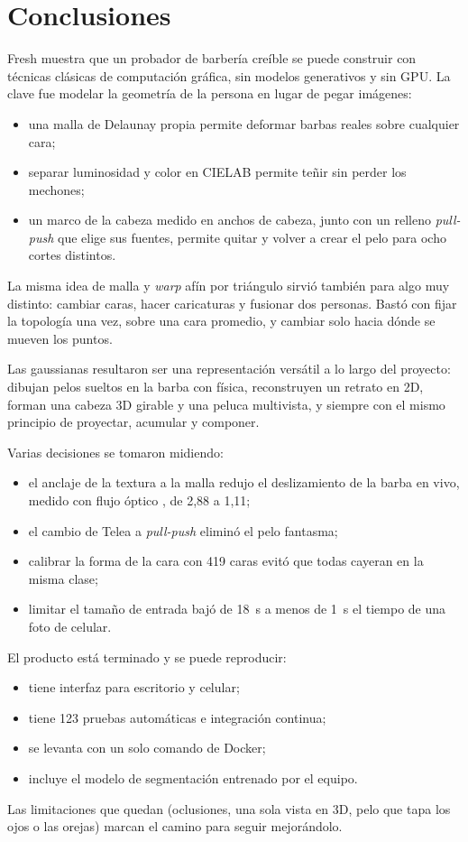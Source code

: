 \section{Conclusiones}
\label{sec:conclusiones}

Fresh muestra que un probador de barbería creíble se puede construir con técnicas clásicas de computación gráfica, sin modelos generativos y sin GPU. La clave fue modelar la geometría de la persona en lugar de pegar imágenes:
\begin{itemize}
  \item una malla de Delaunay propia permite deformar barbas reales sobre cualquier cara;
  \item separar luminosidad y color en CIELAB permite teñir sin perder los mechones;
  \item un marco de la cabeza medido en anchos de cabeza, junto con un relleno \emph{pull-push} que elige sus fuentes, permite quitar y volver a crear el pelo para ocho cortes distintos.
\end{itemize}

La misma idea de malla y \emph{warp} afín por triángulo sirvió también para algo muy distinto: cambiar caras, hacer caricaturas y fusionar dos personas. Bastó con fijar la topología una vez, sobre una cara promedio, y cambiar solo hacia dónde se mueven los puntos.

Las gaussianas resultaron ser una representación versátil a lo largo del proyecto: dibujan pelos sueltos en la barba con física, reconstruyen un retrato en 2D, forman una cabeza 3D girable y una peluca multivista, y siempre con el mismo principio de proyectar, acumular y componer.

Varias decisiones se tomaron midiendo:
\begin{itemize}
  \item el anclaje de la textura a la malla redujo el deslizamiento de la barba en vivo, medido con flujo óptico \cite{farneback2003}, de 2{,}88 a 1{,}11;
  \item el cambio de Telea a \emph{pull-push} eliminó el pelo fantasma;
  \item calibrar la forma de la cara con 419 caras evitó que todas cayeran en la misma clase;
  \item limitar el tamaño de entrada bajó de 18~s a menos de 1~s el tiempo de una foto de celular.
\end{itemize}

El producto está terminado y se puede reproducir:
\begin{itemize}
  \item tiene interfaz para escritorio y celular;
  \item tiene 123 pruebas automáticas e integración continua;
  \item se levanta con un solo comando de Docker;
  \item incluye el modelo de segmentación entrenado por el equipo.
\end{itemize}
Las limitaciones que quedan (oclusiones, una sola vista en 3D, pelo que tapa los ojos o las orejas) marcan el camino para seguir mejorándolo.

